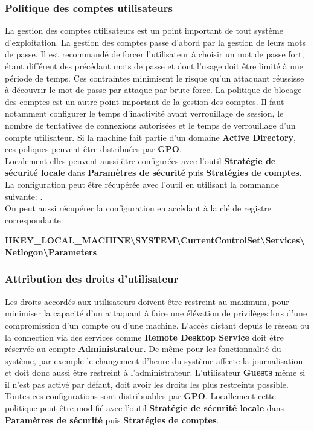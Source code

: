\documentclass[twoside,a4paper,12pt,titlepage]{book}
\begin{document}
\subsubsection{Politique des comptes utilisateurs}
La gestion des comptes utilisateurs est un point important de tout système d'exploitation. La gestion des comptes passe d'abord par la gestion de leurs mots de passe. Il est recommandé de forcer l'utilisateur à choisir un mot de passe fort, étant différent des précédant mots de passe et dont l'usage doit être limité à une période de temps. Ces contraintes minimisent le risque qu'un attaquant  réussisse à découvrir le mot de passe par attaque par brute-force. La politique de blocage des comptes est un autre point important de la gestion des comptes. Il faut notamment configurer le temps d'inactivité avant verrouillage de session,  le nombre de tentatives de connexions autorisées et le temps de verrouillage d'un compte utilisateur. Si la machine fait partie d'un domaine \textbf{Active Directory}, ces poliques peuvent être distribuées par \textbf{GPO}.\\
Localement elles peuvent aussi être configurées avec l'outil \textbf{Stratégie de sécurité locale} dans \textbf{Paramètres de sécurité} puis \textbf{Stratégies de comptes}.\\
La configuration peut être récupérée avec l'outil  en utilisant la commande suivante: .\\
On peut aussi récupérer la configuration en accèdant à la clé de registre correspondante:\\
\begin{center}\bfseries \footnotesize HKEY\_LOCAL\_MACHINE\textbackslash SYSTEM\textbackslash CurrentControlSet\textbackslash Services\textbackslash Netlogon\textbackslash Parameters\end{center}%

\subsubsection{Attribution des droits d'utilisateur}
Les droits accordés aux utilisateurs doivent être restreint au maximum, pour minimiser la capacité d'un attaquant à faire une élévation de privilèges lors d'une compromission d'un compte ou d'une machine. L'accès distant depuis le réseau ou la connection via des services comme \textbf{Remote Desktop Service} doit être réservée au compte \textbf{Administrateur}. De même pour les fonctionnalité du système, par exemple le changement d'heure du système affecte la journalisation et doit donc aussi être restreint à l'administrateur. L'utilisateur \textbf{Guests} même si il n'est pas activé par défaut, doit avoir les droits les plus restreints possible. Toutes ces configurations sont distribuables par \textbf{GPO}. Locallement cette politique peut être modifié avec l'outil \textbf{Stratégie de sécurité locale} dans \textbf{Paramètres de sécurité} puis \textbf{Stratégies de comptes}.\\
\end{document}
